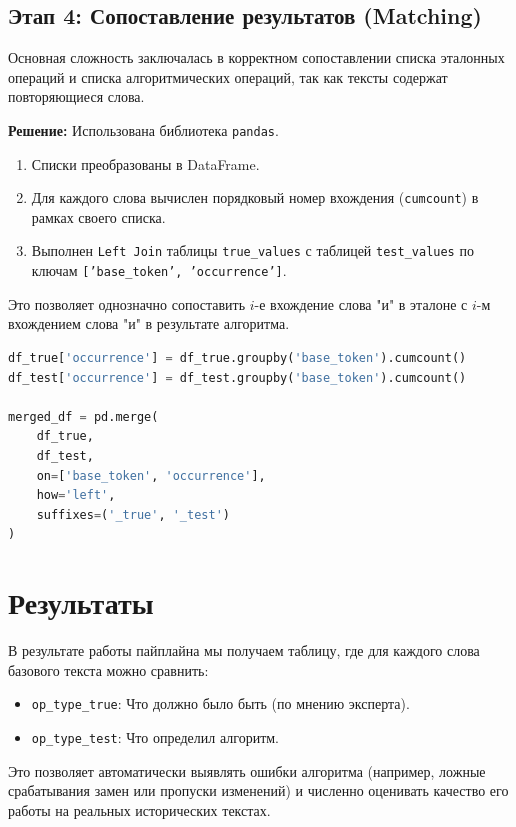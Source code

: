 \documentclass[12pt,a4paper]{article}
\begin{document}
\subsection{Этап 4: Сопоставление результатов (Matching)}
Основная сложность заключалась в корректном сопоставлении списка эталонных операций и списка алгоритмических операций, так как тексты содержат повторяющиеся слова.

\textbf{Решение:}
Использована библиотека \texttt{pandas}.
\begin{enumerate}
    \item Списки преобразованы в DataFrame.
    \item Для каждого слова вычислен порядковый номер вхождения (\texttt{cumcount}) в рамках своего списка.
    \item Выполнен \texttt{Left Join} таблицы \texttt{true\_values} с таблицей \texttt{test\_values} по ключам \texttt{['base\_token', 'occurrence']}.
\end{enumerate}

Это позволяет однозначно сопоставить $i$-е вхождение слова "и" в эталоне с $i$-м вхождением слова "и" в результате алгоритма.

\begin{lstlisting}[language=Python, caption=Пример кода сопоставления]
df_true['occurrence'] = df_true.groupby('base_token').cumcount()
df_test['occurrence'] = df_test.groupby('base_token').cumcount()

merged_df = pd.merge(
    df_true,
    df_test,
    on=['base_token', 'occurrence'],
    how='left',
    suffixes=('_true', '_test')
)
\end{lstlisting}

\section{Результаты}
В результате работы пайплайна мы получаем таблицу, где для каждого слова базового текста можно сравнить:
\begin{itemize}
    \item \texttt{op\_type\_true}: Что должно было быть (по мнению эксперта).
    \item \texttt{op\_type\_test}: Что определил алгоритм.
\end{itemize}

Это позволяет автоматически выявлять ошибки алгоритма (например, ложные срабатывания замен или пропуски изменений) и численно оценивать качество его работы на реальных исторических текстах.
\end{document}
